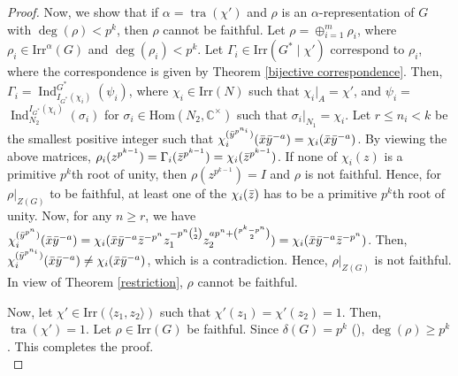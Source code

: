 \documentclass[a4paper,11pt]{amsart}
\numberwithin{equation}{section}
\numberwithin{equation}{subsection}
\newcommand{\C}{\mathbb{C}}
\newcommand{\dg}{\delta(G)}
\newcommand{\irr}{\mathrm{Irr}}
\newcommand{\Hom}{\mathrm{Hom}}
\newcommand{\x}{\Bar{x}}
\newcommand{\y}{\Bar{y}}
\newcommand{\z}{\Bar{z}}
\newcommand{\tra}{\operatorname{tra}}
\begin{document}
\begin{proof}
	Now, we show that if $\alpha= \tra(\chi')$ and $\rho$ is an $\alpha$-representation of $G$ with $\deg(\rho)< p^k$, then $\rho$ cannot be faithful.
	Let $\rho = \oplus_{i=1}^m \rho_i$, where $\rho_i \in \mathrm{Irr}^\alpha(G)$ and $\deg(\rho_i)<p^k$. Let $\Gamma_i \in \irr(G^* \mid \chi')$ correspond to $\rho_i$, where the correspondence is given by Theorem \ref{bijective correspondence}. Then, $\Gamma_i = \operatorname{Ind}^{G^*}_{{I_{G^*}(\chi_i)}}(\psi_i)$, where $\chi_i \in \text{Irr}(N)$ 
	such that $\chi_i |_A= \chi'$, and $\psi_i=$ $\operatorname{Ind}^{I_{G^*}(\chi_i)}_{N_2}(\sigma_i)$ for $\sigma_i \in \Hom(N_2, \C^\times)$ such that $\sigma_i|_{N_1} = \chi_i$. Let $r \leq n_i < k$ be the smallest positive integer such that $\chi_i^{(\y^{p^{n_i}})}(\x\y^{-a}) = \chi_i(\x\y^{-a})$. By viewing the above matrices, $\rho_i(z^{p^{k-1}})= \Gamma_i(\z^{p^{k-1}})= \chi_i(\z^{p^{k-1}})$. If none of $\chi_i(z)$ is a primitive $p^k$th root of unity, then $\rho(z^{p^{k-1}})= I$ and $\rho$ is not faithful.
	Hence, for $\rho|_{Z(G)}$ to be faithful, at least one of the $\chi_i(\z)$ has to be a primitive $p^k$th root of unity.
	Now, for any $n \geq r$, we have $\chi_i^{(\y^{p^{n}})}(\x\y^{-a}) = \chi_i(\x\y^{-a}\z^{-p^n}z_1^{-p^n\binom{1}{2}}z_2^{ap^n+\binom{p^k-p^n}{2}})=\chi_i(\x\y^{-a} \z^{-p^n})$.
	Then, $\chi_i^{(\y^{p^{n_i}})}(\x\y^{-a}) \neq \chi_i(\x\y^{-a})$, which is a contradiction. Hence, $\rho|_{Z(G)}$ is not faithful. In view of Theorem \ref{restriction}, $\rho$ cannot be faithful. 
	
	
	Now, let $\chi' \in \text{Irr}(\langle z_1, z_2 \rangle)$ such that $\chi'(z_1) = \chi'(z_2) = 1$. Then, $\tra(\chi')= 1$. Let $\rho\in \irr(G)$ be faithful. Since $\dg= p^k$ (\cite[Theorem 3.1, (8)]{kaur}), $\deg(\rho) \geq p^k$. This completes the proof. \\
	
	
	

\end{proof}
\end{document}
